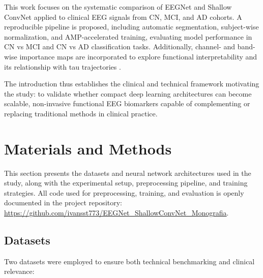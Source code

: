 \documentclass[12pt,a4paper]{article}
\begin{document}
This work focuses on the systematic comparison of EEGNet and Shallow ConvNet applied to clinical EEG signals from CN, MCI, and AD cohorts. A reproducible pipeline is proposed, including automatic segmentation, subject-wise normalization, and AMP-accelerated training, evaluating model performance in CN vs MCI and CN vs AD classification tasks. Additionally, channel- and band-wise importance maps are incorporated to explore functional interpretability and its relationship with tau trajectories \cite{Ajra2023}.

The introduction thus establishes the clinical and technical framework motivating the study: to validate whether compact deep learning architectures can become scalable, non-invasive functional EEG biomarkers capable of complementing or replacing traditional methods in clinical practice.

\section{Materials and Methods}

This section presents the datasets and neural network architectures used in the study, along with the experimental setup, preprocessing pipeline, and training strategies. All code used for preprocessing, training, and evaluation is openly documented in the project repository: \url{https://github.com/ivansst773/EEGNet_ShallowConvNet_Monografia}.

\subsection{Datasets}

Two datasets were employed to ensure both technical benchmarking and clinical relevance:
\end{document}
